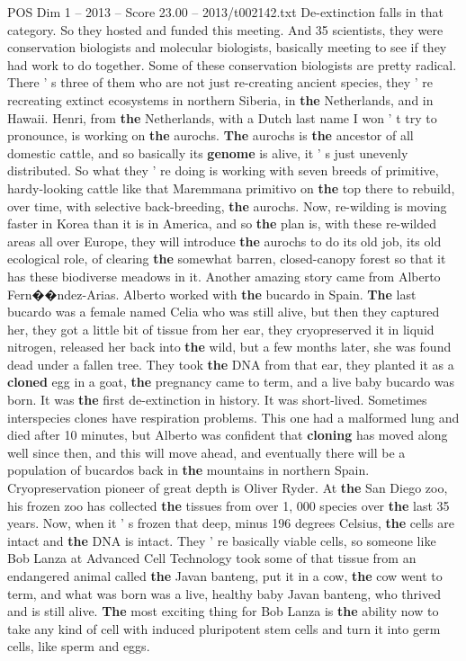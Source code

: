 \begin{textsample}{POS Dim 1 – 2013 – Score 23.00 – 2013/t002142.txt}
De-extinction falls in that category.
So they hosted and funded this meeting.
And 35 scientists, they were conservation biologists and molecular biologists, basically meeting to see if they had work to do together.
Some of these conservation biologists are pretty radical.
There ' s three of them who are not just re-creating ancient species, they ' re recreating extinct ecosystems in northern Siberia, in \textbf{the} Netherlands, and in Hawaii.
Henri, from \textbf{the} Netherlands, with a Dutch last name I won ' t try to pronounce, is working on \textbf{the} aurochs. \textbf{The} aurochs is \textbf{the} ancestor of all domestic cattle, and so basically its \textbf{genome} is alive, it ' s just unevenly distributed.
So what they ' re doing is working with seven breeds of primitive, hardy-looking cattle like that Maremmana primitivo on \textbf{the} top there to rebuild, over time, with selective back-breeding, \textbf{the} aurochs.
Now, re-wilding is moving faster in Korea than it is in America, and so \textbf{the} plan is, with these re-wilded areas all over Europe, they will introduce \textbf{the} aurochs to do its old job, its old ecological role, of clearing \textbf{the} somewhat barren, closed-canopy forest so that it has these biodiverse meadows in it.
Another amazing story came from Alberto Fern{\EmojiFont �}{\EmojiFont �}ndez-Arias.
Alberto worked with \textbf{the} bucardo in Spain. \textbf{The} last bucardo was a female named Celia who was still alive, but then they captured her, they got a little bit of tissue from her ear, they cryopreserved it in liquid nitrogen, released her back into \textbf{the} wild, but a few months later, she was found dead under a fallen tree.
They took \textbf{the} DNA from that ear, they planted it as a \textbf{cloned} egg in a goat, \textbf{the} pregnancy came to term, and a live baby bucardo was born.
It was \textbf{the} first de-extinction in history.
It was short-lived.
Sometimes interspecies clones have respiration problems.
This one had a malformed lung and died after 10 minutes, but Alberto was confident that \textbf{cloning} has moved along well since then, and this will move ahead, and eventually there will be a population of bucardos back in \textbf{the} mountains in northern Spain.
Cryopreservation pioneer of great depth is Oliver Ryder.
At \textbf{the} San Diego zoo, his frozen zoo has collected \textbf{the} tissues from over 1, 000 species over \textbf{the} last 35 years.
Now, when it ' s frozen that deep, minus 196 degrees Celsius, \textbf{the} cells are intact and \textbf{the} DNA is intact.
They ' re basically viable cells, so someone like Bob Lanza at Advanced Cell Technology took some of that tissue from an endangered animal called \textbf{the} Javan banteng, put it in a cow, \textbf{the} cow went to term, and what was born was a live, healthy baby Javan banteng, who thrived and is still alive. \textbf{The} most exciting thing for Bob Lanza is \textbf{the} ability now to take any kind of cell with induced pluripotent stem cells and turn it into germ cells, like sperm and eggs.

\end{textsample}
